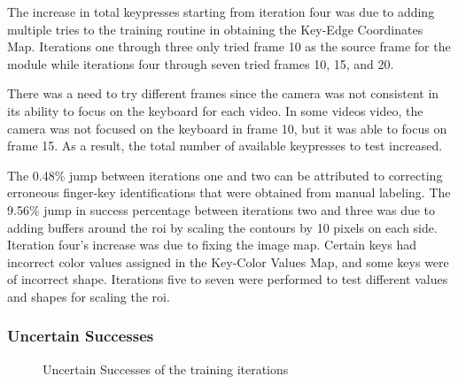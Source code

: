 \documentclass{report}
\begin{document}
The increase in total keypresses starting from iteration four was due to adding
multiple tries to the training routine in obtaining the Key-Edge Coordinates
Map. Iterations one through three only tried frame 10 as the source frame for
the module while iterations four through seven tried frames 10, 15, and 20.

There was a need to try different frames since the camera was not consistent in
its ability to focus on the keyboard for each video. In some videos video, the
camera was not focused on the keyboard in frame 10, but it was able to focus on
frame 15. As a result, the total number of available keypresses to test
increased.

The 0.48\% jump between iterations one and two can be attributed to correcting
erroneous finger-key identifications that were obtained from manual labeling.
The 9.56\% jump in success percentage between iterations two and three was due
to adding buffers around the \ac{roi} by scaling the contours by 10 pixels on
each side. Iteration four's increase was due to fixing the image map. Certain
keys had incorrect color values assigned in the Key-Color Values Map, and some
keys were of incorrect shape. Iterations five to seven were performed to test
different values and shapes for scaling the \ac{roi}.

\subsubsection{Uncertain Successes}

\begin{figure}[H]
	\centering
	\caption{Uncertain Successes of the training iterations}
	\label{fig:rd-training-uncertain-successes}
\end{figure}
\end{document}
